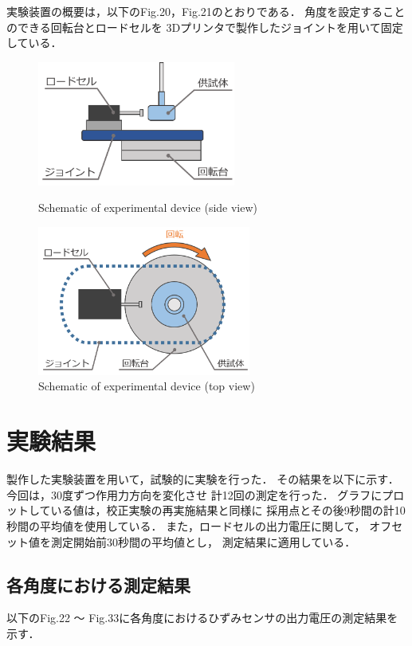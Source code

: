 \documentclass[twocolumn,a4j]{jsarticle}
\begin{document}
実験装置の概要は，以下のFig.20，Fig.21のとおりである．
角度を設定することのできる回転台とロードセルを
3Dプリンタで製作したジョイントを用いて固定している．

\begin{figure}[htbp]
    \footnotesize
    \begin{center}
        \includegraphics[width=65mm]{../images/rotation.png}
        \caption{Schematic of experimental device (side view)}
        \includegraphics[width=70mm]{../images/rotation_2.png}
        \caption{Schematic of experimental device (top view)}
    \end{center}
\end{figure}

\newpage

\section{実験結果}
製作した実験装置を用いて，試験的に実験を行った．
その結果を以下に示す．
今回は，30度ずつ作用力方向を変化させ
計12回の測定を行った．
グラフにプロットしている値は，校正実験の再実施結果と同様に
採用点とその後9秒間の計10秒間の平均値を使用している．
また，ロードセルの出力電圧に関して，
オフセット値を測定開始前30秒間の平均値とし，
測定結果に適用している．\\

\subsection{各角度における測定結果}
以下のFig.22 ～ Fig.33に各角度におけるひずみセンサの出力電圧の測定結果を示す．
\end{document}
